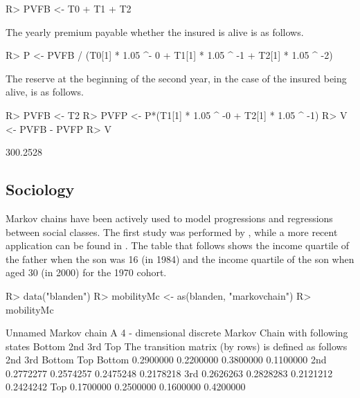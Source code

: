 \documentclass[nojss]{jss}
\begin{document}
\begin{Schunk}
\begin{Sinput}
R> PVFB <- T0 %
+    T1 %
+    T2 %
\end{Sinput}
\end{Schunk}

The yearly premium payable whether the insured is alive is as follows. 

\begin{Schunk}
\begin{Sinput}
R> P <- PVFB / (T0[1] * 1.05 ^- 0 + T1[1] * 1.05 ^ -1 + T2[1] * 1.05 ^ -2)
\end{Sinput}
\end{Schunk}

The reserve at the beginning of the second year, in the case of the insured being alive, is as follows.

\begin{Schunk}
\begin{Sinput}
R> PVFB <- T2 %
R> PVFP <- P*(T1[1] * 1.05 ^ -0 + T2[1] * 1.05 ^ -1)
R> V <- PVFB - PVFP
R> V
\end{Sinput}
\begin{Soutput}
         [,1]
[1,] 300.2528
\end{Soutput}
\end{Schunk}

\subsection{Sociology}\label{app:sociology}

Markov chains have been actively used to model progressions and regressions between social classes. The first study was performed by \cite{glassHall}, while a more recent application can be found in \cite{blandenEtAlii}. The table that follows shows the income quartile of the father when the son was 16 (in 1984) and the income quartile of the son when aged 30 (in 2000) for the 1970 cohort.

\begin{Schunk}
\begin{Sinput}
R> data("blanden")
R> mobilityMc <- as(blanden, "markovchain")
R> mobilityMc
\end{Sinput}
\begin{Soutput}
Unnamed Markov chain 
 A  4 - dimensional discrete Markov Chain with following states 
 Bottom 2nd 3rd Top 
 The transition matrix   (by rows)  is defined as follows 
             2nd       3rd    Bottom       Top
Bottom 0.2900000 0.2200000 0.3800000 0.1100000
2nd    0.2772277 0.2574257 0.2475248 0.2178218
3rd    0.2626263 0.2828283 0.2121212 0.2424242
Top    0.1700000 0.2500000 0.1600000 0.4200000
\end{Soutput}
\end{Schunk}
\end{document}
